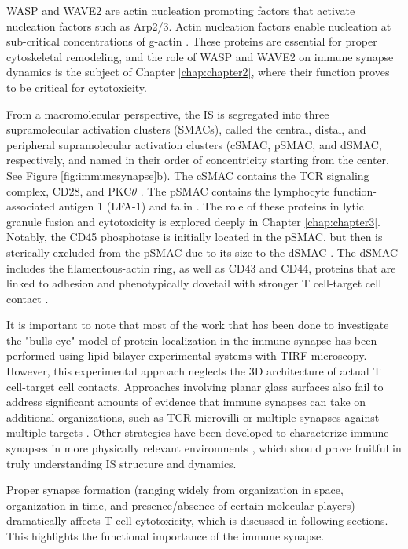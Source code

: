 WASP and WAVE2 are actin nucleation promoting factors that activate nucleation factors such as Arp2/3. Actin nucleation factors enable nucleation at sub-critical concentrations of g-actin \cite{Carlsson2005}. These proteins are essential for proper cytoskeletal remodeling, and the role of WASP and WAVE2 on immune synapse dynamics is the subject of Chapter \ref{chap:chapter2}, where their function proves to be critical for cytotoxicity.

From a macromolecular perspective, the IS is segregated into three supramolecular activation clusters (SMACs), called the central, distal, and peripheral supramolecular activation clusters (cSMAC, pSMAC, and dSMAC, respectively, and named in their order of concentricity starting from the center. See Figure \ref{fig:immunesynapse}b). The cSMAC contains the TCR signaling complex, CD28, and PKC$\theta$ \cite{Monks1998, Tseng2008}. The pSMAC contains the lymphocyte function-associated antigen 1 (LFA-1) and talin \cite{Monks1998}. The role of these proteins in lytic granule fusion and cytotoxicity is explored deeply in Chapter \ref{chap:chapter3}. Notably, the CD45 phosphotase is initially located in the pSMAC, but then is sterically excluded from the pSMAC due to its size to the dSMAC \cite{Johnson2000}. The dSMAC includes the filamentous-actin ring, as well as CD43 and CD44, proteins that are linked to adhesion and phenotypically dovetail with stronger T cell-target cell contact \cite{Yu2013}.

It is important to note that most of the work that has been done to investigate the "bulls-eye" model of protein localization in the immune synapse has been performed using lipid bilayer experimental systems with TIRF microscopy. However, this experimental approach neglects the 3D architecture of actual T cell-target cell contacts.  Approaches involving planar glass surfaces also fail to address significant amounts of evidence that immune synapses can take on additional organizations, such as TCR microvilli \cite{Kim2018} or multiple synapses against multiple targets \cite{Vorselen2020}. Other strategies have been developed to characterize immune synapses in more physically relevant environments \cite{Jin2019}, which should prove fruitful in truly understanding IS structure and dynamics.

Proper synapse formation (ranging widely from organization in space, organization in time, and presence/absence of certain molecular players) dramatically affects T cell cytotoxicity, which is discussed in following sections. This highlights the functional importance of the immune synapse.

